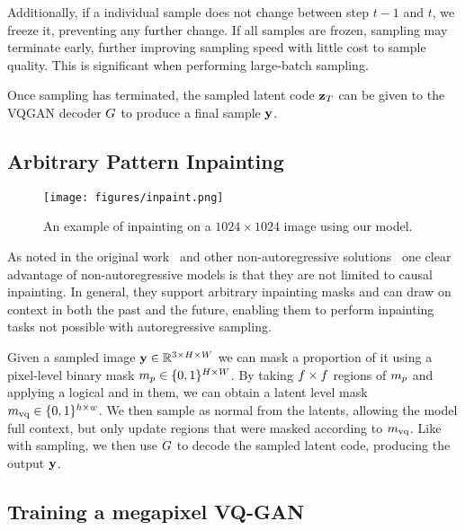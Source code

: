 Additionally, if a individual sample does not change between step $t-1$ and $t$,
we freeze it, preventing any further change. If all samples are frozen, sampling
may terminate early, further improving sampling speed with little cost to
sample quality. This is significant when performing large-batch sampling.

Once sampling has terminated, the sampled latent code $\mathbf{z}_T$ can be given
to the VQGAN decoder $G$ to produce a final sample $\mathbf{y}$.

\subsection{Arbitrary Pattern Inpainting}

\begin{figure}[t]
    \label{fig:inpaintExample}
    \centering
    \texttt{[image: figures/inpaint.png]}
    \caption{An example of inpainting on a $1024 \times 1024$ image using our
    model.}
\end{figure}

As noted in the original work~\cite{savinov2022stepunrolled} and other
non-autoregressive solutions~\cite{bondtaylor2021unleashing} one clear advantage
of non-autoregressive models is that they are not limited to causal inpainting.
In general, they support arbitrary inpainting masks and can draw on context in
both the past and the future, enabling them to perform inpainting tasks not
possible with autoregressive sampling.

Given a sampled image $\mathbf{y} \in \mathbb{R}^{3 \times H \times W}$ we can mask a
proportion of it using a pixel-level binary mask $m_p \in \{0, 1\}^{H
\times W}$. By taking $f \times f$ regions of
$m_p$ and applying a logical and in them, we can obtain a latent level
mask $m_\textrm{vq} \in \{0,1\}^{h \times w}$. We then sample as normal from the
latents, allowing the model full context, but only update regions that were
masked according to $m_\textrm{vq}$. Like with sampling, we then use $G$
to decode the sampled latent code, producing the output $\mathbf{y}$.

\subsection{Training a megapixel VQ-GAN}

